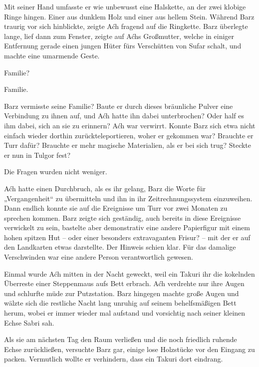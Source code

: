 Mit seiner Hand umfasste er wie unbewusst eine Halskette, an der zwei klobige Ringe hingen. Einer aus dunklem Holz und einer aus hellem Stein. Während Barz traurig vor sich hinblickte, zeigte Aćh fragend auf die Ringkette. Barz überlegte lange, lief dann zum Fenster, zeigte auf Aćhs Großmutter, welche in einiger Entfernung gerade einen jungen Hüter fürs Verschütten von Sufar schalt, und machte eine umarmende Geste.

Familie?

Familie.

Barz vermisste seine Familie? Baute er durch dieses bräunliche Pulver eine Verbindung zu ihnen auf, und Aćh hatte ihn dabei unterbrochen? Oder half es ihm dabei, sich an sie zu erinnern? Aćh war verwirrt. Konnte Barz sich etwa nicht einfach wieder dorthin zurückteleportieren, woher er gekommen war? Brauchte er Turr dafür? Brauchte er mehr magische Materialien, als er bei sich trug? Steckte er nun in Tulgor fest?

Die Fragen wurden nicht weniger.\bigskip







Aćh hatte einen Durchbruch, als es ihr gelang, Barz die Worte für „Vergangenheit“ zu übermitteln und ihn in ihr Zeitrechnungssystem einzuweihen. Dann endlich konnte sie auf die Ereignisse um Turr vor zwei Monaten zu sprechen kommen. Barz zeigte sich geständig, auch bereits in diese Ereignisse verwickelt zu sein, bastelte aber demonstrativ eine andere Papierfigur mit einem hohen spitzen Hut – oder einer besonders extravaganten Frisur? – mit der er auf den Landkarten etwas darstellte. Der Hinweis schien klar. Für das damalige Verschwinden war eine andere Person verantwortlich gewesen.\bigskip







Einmal wurde Aćh mitten in der Nacht geweckt, weil ein Takuri ihr die kokelnden Überreste einer Steppenmaus aufs Bett erbrach. Aćh verdrehte nur ihre Augen und schlurfte müde zur Putzstation. Barz hingegen machte große Augen und wälzte sich die restliche Nacht lang unruhig auf seinem behelfsmäßigen Bett herum, wobei er immer wieder mal aufstand und vorsichtig nach seiner kleinen Echse Sabri sah.

Als sie am nächsten Tag den Raum verließen und die noch friedlich ruhende Echse zurückließen, versuchte Barz gar, einige lose Holzstücke vor den Eingang zu packen. Vermutlich wollte er verhindern, dass ein Takuri dort eindrang.

